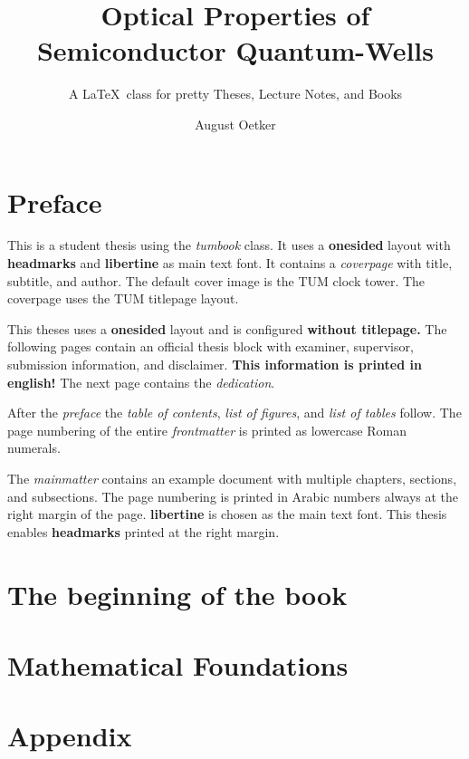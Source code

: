 \documentclass[thesis=student,titlepage=false,oneside,
  headmarks=true,automark,font=libertine]{tumbook}
\title{Optical Properties of Semiconductor Quantum-Wells}
\subtitle{A \LaTeX\ class for pretty Theses, Lecture Notes, and Books}
\author{August Oetker}
\begin{document}
\frontmatter
\maketitle

\chapter{Preface}
 {\color{TUMOrange}This is a student thesis using the \emph{tumbook} class.
  It uses a \textbf{onesided} layout with \textbf{headmarks} and
  \textbf{libertine} as main text font.
  It contains a \emph{coverpage} with title, subtitle, and author.
  The default cover image is the TUM clock tower. The coverpage uses the TUM
  titlepage layout.\par
  This theses uses a \textbf{onesided} layout and is configured
  \textbf{without titlepage.} The following pages contain an official thesis
  block with examiner, supervisor, submission information, and disclaimer.
  \textbf{This information is printed in english!}
  The next page contains the \emph{dedication}.\par
  After the \emph{preface} the \emph{table of contents},
  \emph{list of figures}, and \emph{list of tables} follow.
  The page numbering of the entire \emph{frontmatter} is printed as
  lowercase Roman numerals.\par
  The \emph{mainmatter} contains an example document with multiple chapters,
  sections, and subsections. The page numbering is printed in Arabic numbers
  always at the right margin of the page. \textbf{libertine} is chosen as the
  main text font. This thesis enables \textbf{headmarks} printed at the right
  margin.
 }

\lipsum[1-4]
\cleardoublepage

\tableofcontents
\listoffigures
\listoftables

\mainmatter
\chapter{The beginning of the book}


\chapter{Mathematical Foundations}


\appendix
\chapter{Appendix}


\backmatter


\end{document}
